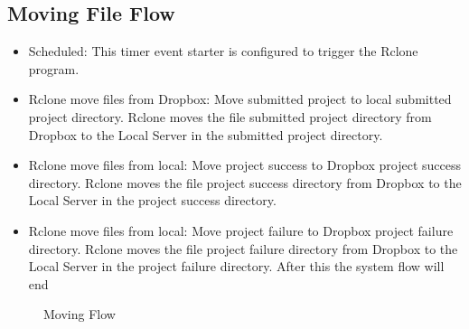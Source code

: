 \subsection{Moving File Flow}
\begin{itemize}
\item Scheduled: This timer event starter is configured to trigger the Rclone program.
\item Rclone move files from Dropbox: Move submitted project to local submitted project directory. Rclone moves the file submitted project directory from Dropbox to the Local Server in the submitted project directory.
\item Rclone move files from local: Move project success to Dropbox project success directory. Rclone moves the file project success directory from Dropbox to the Local Server in the project success directory.
\item Rclone move files from local: Move project failure to Dropbox project failure directory. Rclone moves the file project failure directory from Dropbox to the Local Server in the project failure directory. After this the system flow will end
\end{itemize}
\begin{figure}[h!]
	\centering
    \caption{Moving Flow}
	\label{fig:f14}
 \end{figure}
\newpage
